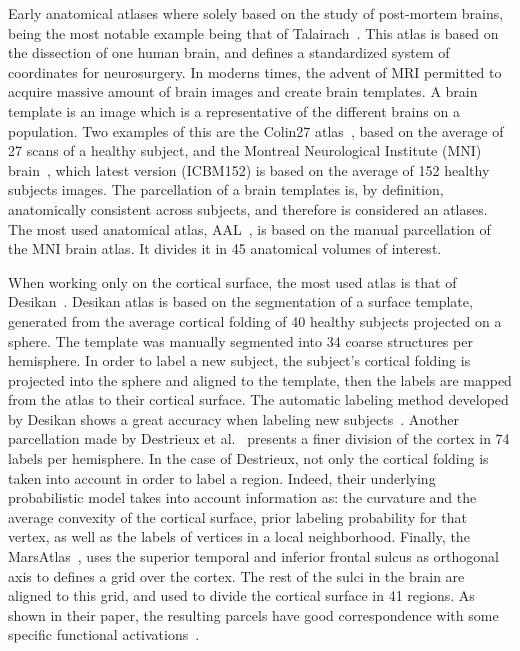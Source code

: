 Early anatomical atlases where solely based on the study of post-mortem brains,
being the most notable example being that of Talairach~\cite{Talairach1988}.
This atlas is based on the dissection of one human brain, and defines a
standardized system of coordinates for neurosurgery. In moderns times, the
advent of MRI permitted to acquire massive amount
of brain images and create brain templates. A brain template is an image
which is a representative of the different brains on a population. Two
examples of this are the Colin27 atlas~\cite{Collins1998}, based on the average
of 27 scans of a healthy subject, and the Montreal Neurological Institute (MNI) brain~\cite{Holmes1998},
which latest version (ICBM152) is based on the average of 152 healthy subjects images.
The parcellation of a brain templates is, by definition, anatomically
consistent across subjects, and therefore is considered an atlases. The
most used anatomical atlas, AAL~\cite{Landeau2002}, is based on the manual
parcellation of the MNI brain atlas. It divides it in 45 anatomical
volumes of interest.

When working only on the cortical surface, the most used atlas is that of
Desikan~\cite{Desikan2006}. Desikan atlas is based on the segmentation of a surface
template, generated from the average cortical folding of 40 healthy subjects
projected on a sphere. The template was manually segmented into 34 coarse 
structures per hemisphere. In order to label a new subject, the subject's cortical 
folding is projected into the sphere and aligned to the template, then 
the labels are mapped from the atlas to their cortical surface. The automatic
labeling method developed by Desikan shows a great accuracy when labeling
new subjects~\cite{Desikan2006}. Another parcellation made by 
Destrieux et al.~\cite{Destrieux2010} presents a finer division of the cortex in
74 labels per hemisphere. In the case of Destrieux, not only the cortical
folding is taken into account in order to label a region. Indeed, their
underlying probabilistic model takes into account information as: the curvature
and the average convexity of the cortical surface, prior labeling probability for
that vertex, as well as the labels of vertices in a local neighborhood.
Finally, the MarsAtlas~\cite{Auzias2016}, uses the superior temporal
and inferior frontal sulcus as orthogonal axis to defines a grid over the cortex.
The rest of the sulci in the brain are aligned to this grid, and used to divide
the cortical surface in 41 regions. As shown in their paper, the resulting parcels
have good correspondence with some specific functional activations~\cite{Auzias2016}.

